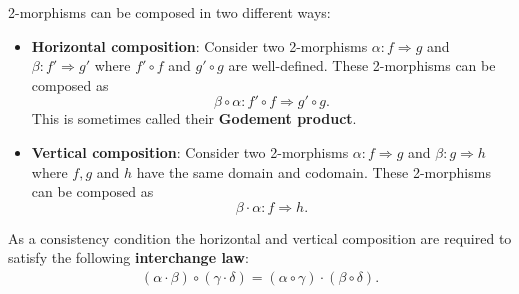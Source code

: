     \begin{property}
        2-morphisms can be composed in two different ways:
        \begin{itemize}
            \item\textbf{Horizontal composition}:
                Consider two 2-morphisms $\alpha:f\Rightarrow g$ and $\beta:f'\Rightarrow g'$ where $f'\circ f$ and $g'\circ g$ are well-defined. These 2-morphisms can be composed as \[\beta\circ\alpha: f'\circ f\Rightarrow g'\circ g.\] This is sometimes called their \textbf{Godement product}.
            \item\textbf{Vertical composition}:
                Consider two 2-morphisms $\alpha:f\Rightarrow g$ and $\beta:g\Rightarrow h$ where $f,g$ and $h$ have the same domain and codomain. These 2-morphisms can be composed as \[\beta\cdot\alpha:f\Rightarrow h.\]
        \end{itemize}
        As a consistency condition the horizontal and vertical composition are required to satisfy the following \textbf{interchange law}:
        \begin{gather}
            (\alpha\cdot\beta)\circ(\gamma\cdot\delta) = (\alpha\circ\gamma)\cdot(\beta\circ\delta).
        \end{gather}
    \end{property}


